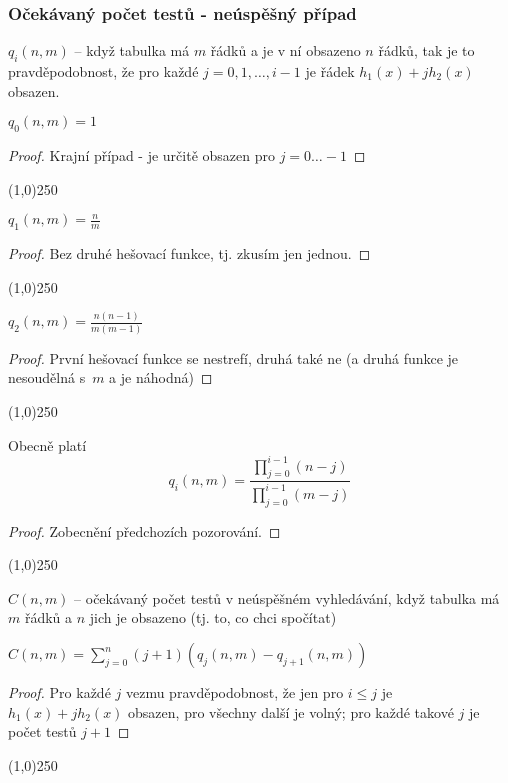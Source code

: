 \documentclass[a4paper,12pt]{article}
\newenvironment{myproof}{
  \begin{proof}
    
  }{
  \end{proof}
  \begin{center}
   \line(1,0){250}
   \end{center}
  }
\begin{document}
\subsubsection{Očekávaný počet testů - neúspěšný případ}


\begin{definice} $q_i(n,m)$ -- když tabulka má $m$ řádků a 
je v ní obsazeno $n$ řádků, tak je to 
pravděpodobnost, že pro každé $j=0,1,\dots,i-1$ je 
řádek $h_1(x)+jh_2(x)$ obsazen.
\end{definice} 

\begin{pozorovani} $q_0(n,m)=1$
\end{pozorovani}
\begin{myproof}
    Krajní případ - je určitě obsazen pro $j=0 \dots -1$
\end{myproof}

\begin{pozorovani} $q_1(n,m)=\frac nm$
\end{pozorovani}
\begin{myproof}
    Bez druhé hešovací funkce, tj. zkusím jen jednou.
\end{myproof}

\begin{pozorovani} $q_2(n,m)=\frac {n(n-1)}{m(m-1)}$
\end{pozorovani}
\begin{myproof}
    První hešovací funkce se nestrefí, druhá také ne (a druhá funkce je nesoudělná s~$m$ a je náhodná)
\end{myproof}

\begin{lemma} 
    Obecně platí $$q_i(n,m)=\frac {\prod_{j=0}^{i-1}(n-j)}{\prod_{j=0}^{i-1}(m-j)}$$
\end{lemma}
\begin{myproof}
Zobecnění předchozích pozorování.
\end{myproof}

\begin{definice}
$C(n,m)$ -- očekávaný počet testů v neúspěšném 
vyhledávání, když tabulka má $m$ řádků a $
n$ jich 
je obsazeno (tj. to, co chci spočítat)
\end{definice}

\begin{lemma}
    $C(n,m)=\sum_{j=0}^n(j+1)(q_j(n,m)-q_{j+1}(n,m))$
\end{lemma}
\begin{myproof}
    Pro každé $j$ vezmu pravděpodobnost, že jen pro $i\le j$ je $h_1(x)+jh_2(x)$ obsazen, pro všechny další je volný; pro každé takové $j$ je počet testů $j+1$ 
\end{myproof}
\end{document}

